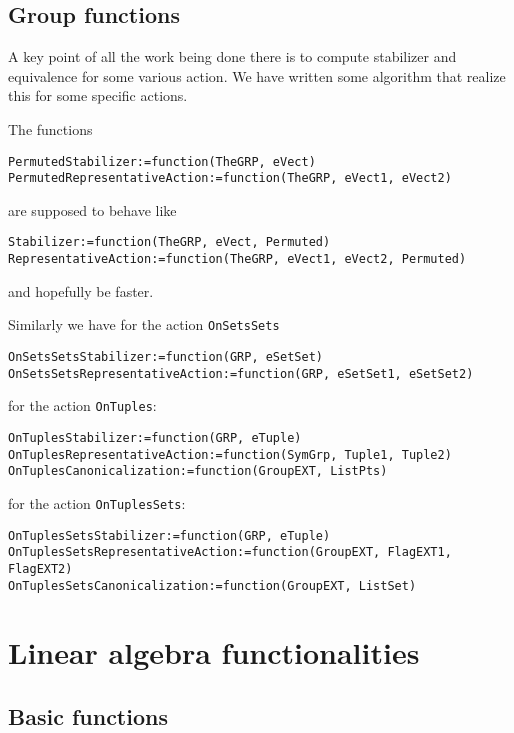 \documentclass[12pt]{amsart}
\begin{document}
\subsection{Group functions}

A key point of all the work being done there is to compute stabilizer
and equivalence for some various action.
We have written some algorithm that realize this for some specific
actions.

The functions
\begin{verbatim}
PermutedStabilizer:=function(TheGRP, eVect)
PermutedRepresentativeAction:=function(TheGRP, eVect1, eVect2)
\end{verbatim}
are supposed to behave like
\begin{verbatim}
Stabilizer:=function(TheGRP, eVect, Permuted)
RepresentativeAction:=function(TheGRP, eVect1, eVect2, Permuted)
\end{verbatim}
and hopefully be faster.


Similarly we have for the action {\tt OnSetsSets}
\begin{verbatim}
OnSetsSetsStabilizer:=function(GRP, eSetSet)
OnSetsSetsRepresentativeAction:=function(GRP, eSetSet1, eSetSet2)
\end{verbatim}
for the action {\tt OnTuples}:
\begin{verbatim}
OnTuplesStabilizer:=function(GRP, eTuple)
OnTuplesRepresentativeAction:=function(SymGrp, Tuple1, Tuple2)
OnTuplesCanonicalization:=function(GroupEXT, ListPts)
\end{verbatim}
for the action {\tt OnTuplesSets}:
\begin{verbatim}
OnTuplesSetsStabilizer:=function(GRP, eTuple)
OnTuplesSetsRepresentativeAction:=function(GroupEXT, FlagEXT1, FlagEXT2)
OnTuplesSetsCanonicalization:=function(GroupEXT, ListSet)
\end{verbatim}



\section{Linear algebra functionalities}


\subsection{Basic functions}
\end{document}
